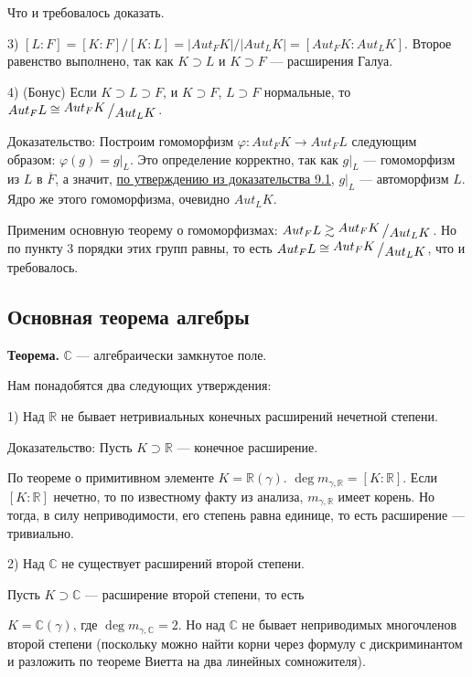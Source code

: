 \documentclass[../main.tex]{subfiles}
\begin{document}
    Что и требовалось доказать.

    3) $[L : F] = [K : F] / [K : L] = |Aut_FK| / |Aut_LK| =  [Aut_FK : Aut_LK]$.
    Второе равенство выполнено, так как $K \supset L$ и $K \supset F$
    --- расширения Галуа.

    4) \hypertarget{9.4.bonus}{(Бонус)}
    Если $K \supset L \supset F$, и $K \supset F$, $L \supset F$
    нормальные, то $Aut_FL \cong \bigslant{Aut_FK}{Aut_LK}$.

    Доказательство: Построим гомоморфизм $\varphi: Aut_FK \to Aut_FL$ следующим
    образом: $\varphi(g) = g|_L$. Это определение корректно, так как
    $g|_L$ --- гомоморфизм из $L$ в $\overline{F}$, а значит,
    \hyperlink{9.1.statement.2}{по утверждению из доказательства 9.1},
    $g|_L$ --- автоморфизм $L$. Ядро же этого гомоморфизма, очевидно $Aut_LK$.

    Применим основную теорему о гомоморфизмах:
    $Aut_FL \gtrsim \bigslant{Aut_FK}{Aut_LK}$. Но по пункту 3 порядки этих групп
    равны, то есть $Aut_FL \cong \bigslant{Aut_FK}{Aut_LK}$, что и требовалось.

\hypertarget{9.5}{\subsection{Основная теорема алгебры}}

    \textbf{Теорема.} $\mathbb{C}$ --- алгебраически замкнутое поле.

    Нам понадобятся два следующих утверждения:

    1) Над $\mathbb{R}$ не бывает нетривиальных конечных расширений нечетной
    степени.

    Доказательство: Пусть $K \supset \mathbb{R}$ --- конечное расширение.

    По теореме о примитивном элементе $K = \mathbb{R}(\gamma)$.
    $\deg m_{\gamma, \mathbb{R}} = [K : \mathbb{R}]$. Если $[K : \mathbb{R}]$
    нечетно, то по известному факту из анализа, $m_{\gamma, \mathbb{R}}$ имеет
    корень. Но тогда, в силу неприводимости, его степень равна единице, то есть
    расширение --- тривиально.

    2) Над $\mathbb{C}$ не существует расширений второй степени.

    Пусть $K \supset \mathbb{C}$ --- расширение второй степени, то есть

    $K = \mathbb{C}(\gamma)$, где $\deg m_{\gamma, \mathbb{C}} = 2$. Но над
    $\mathbb{C}$ не бывает неприводимых многочленов второй степени
    (поскольку можно найти корни через формулу с дискриминантом и разложить
    по теореме Виетта на два линейных сомножителя).
\end{document}
